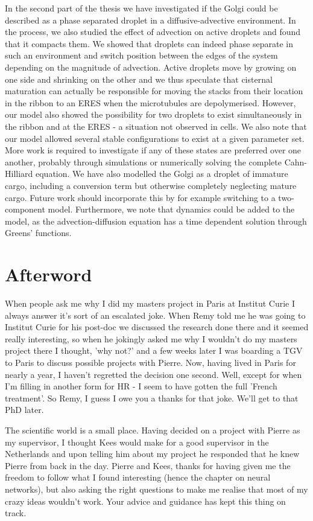 \documentclass{Dissertate}
\begin{document}
In the second part of the thesis we have investigated if the Golgi could be described as a phase separated droplet in a diffusive-advective environment. In the process, we also studied the effect of advection on active droplets and found that it compacts them. We showed that droplets can indeed phase separate in such an environment and switch position between the edges of the system depending on the magnitude of advection. Active droplets move by growing on one side and shrinking on the other and we thus speculate that cisternal maturation can actually be responsible for moving the stacks from their location in the ribbon to an ERES when the microtubules are depolymerised. However, our model also showed the possibility for two droplets to exist simultaneously in the ribbon and at the ERES - a situation not observed in cells. We also note that our model allowed several stable configurations to exist at a given parameter set. More work is required to investigate if any of these states are preferred over one another, probably through simulations or numerically solving the complete Cahn-Hilliard equation. We have also modelled the Golgi as a droplet of immature cargo, including a conversion term but otherwise completely neglecting mature cargo. Future work should incorporate this by for example switching to a two-component model. Furthermore, we note that dynamics could be added to the model, as the advection-diffusion equation has a time dependent solution through Greens' functions. 

\section{Afterword}

When people ask me why I did my masters project in Paris at Institut Curie I always answer it's sort of an escalated joke. When Remy told me he was going to Institut Curie for his post-doc we discussed the research done there and it seemed really interesting, so when he jokingly asked me why I wouldn't do my masters project there I thought, 'why not?' and a few weeks later I was boarding a TGV to Paris to discuss possible projects with Pierre. Now, having lived in Paris for nearly a year, I haven't regretted the decision one second. Well, except for when I'm filling in another form for HR - I seem to have gotten the full 'French treatment'. So Remy, I guess I owe you a thanks for that joke. We'll get to that PhD later.  

The scientific world is a small place. Having decided on a project with Pierre as my supervisor, I thought Kees would make for a good supervisor in the Netherlands and upon telling him about my project he responded that he knew Pierre from back in the day. Pierre and Kees, thanks for having given me the freedom to follow what I found interesting (hence the chapter on neural networks), but also asking the right questions to make me realise that most of my crazy ideas wouldn't work. Your advice and guidance has kept this thing on track. 
\end{document}

